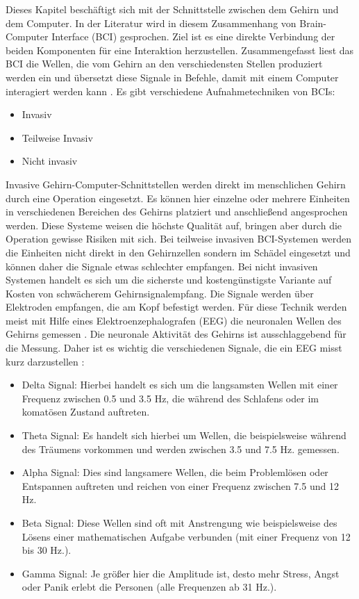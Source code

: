 Dieses Kapitel beschäftigt sich mit der Schnittstelle zwischen dem Gehirn und dem Computer. In der Literatur wird in diesem Zusammenhang von Brain-Computer Interface (BCI) gesprochen. Ziel ist es eine direkte Verbindung der beiden Komponenten für eine Interaktion herzustellen. Zusammengefasst liest das BCI die Wellen, die vom Gehirn an den verschiedensten Stellen produziert werden ein und übersetzt diese Signale in Befehle, damit mit einem Computer interagiert werden kann \cite{BRAIN}.
\newline \newline
Es gibt verschiedene Aufnahmetechniken von BCIs:
\begin{itemize}
      \item Invasiv
      \item Teilweise Invasiv
			\item Nicht invasiv
\end{itemize}
\vspace{\baselineskip}
Invasive Gehirn-Computer-Schnittstellen werden direkt im menschlichen Gehirn durch eine Operation eingesetzt. Es können hier einzelne oder mehrere Einheiten in verschiedenen Bereichen des Gehirns platziert und anschließend angesprochen werden. Diese Systeme weisen die höchste Qualität auf, bringen aber durch die Operation gewisse Risiken mit sich.
Bei teilweise invasiven BCI-Systemen werden die Einheiten nicht direkt in den Gehirnzellen sondern im Schädel eingesetzt und können daher die Signale etwas schlechter empfangen. Bei nicht invasiven Systemen handelt es sich um die sicherste und kostengünstigste Variante auf Kosten von schwächerem Gehirnsignalempfang. Die Signale werden über Elektroden empfangen, die am Kopf befestigt werden. Für diese Technik werden meist mit Hilfe eines Elektroenzephalografen (EEG) die neuronalen Wellen des Gehirns gemessen \cite{BRAIN}.
\newline \newline
Die neuronale Aktivität des Gehirns ist ausschlaggebend für die Messung. Daher ist es wichtig die verschiedenen Signale, die ein EEG misst kurz darzustellen \cite{BRAIN}:
\begin{itemize}
      \item Delta Signal: Hierbei handelt es sich um die langsamsten Wellen mit einer Frequenz zwischen 0.5 und 3.5 Hz, die während des Schlafens oder im komatösen Zustand auftreten.
      \item Theta Signal: Es handelt sich hierbei um Wellen, die beispielsweise während des Träumens vorkommen und werden zwischen 3.5 und 7.5 Hz. gemessen.
			\item Alpha Signal: Dies sind langsamere Wellen, die beim Problemlösen oder Entspannen auftreten und reichen von einer Frequenz zwischen 7.5 und 12 Hz.
			\item Beta Signal: Diese Wellen sind oft mit Anstrengung wie beispielsweise des Lösens einer mathematischen Aufgabe verbunden (mit einer Frequenz von 12 bis 30 Hz.).
      \item Gamma Signal: Je größer hier die Amplitude ist, desto mehr Stress, Angst oder Panik erlebt die Personen (alle Frequenzen ab 31 Hz.).
\end{itemize}
